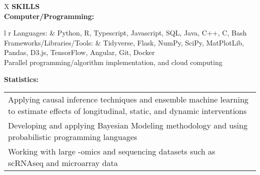 \begin{center}
    \begin{tabularx}{\textwidth}{X}
        {\large \textbf{SKILLS}} \\
        \small \textbf{Computer/Programming:} \\
        {
            \begin{tabularx}{\linewidth}{l r}
                \small \tabitem Languages: & \small Python, R, Typescript, Javascript, SQL, Java, C++, C, Bash \\
                \small \tabitem Frameworks/Libraries/Tools: & \small Tidyverse, Flask, NumPy, SciPy, MatPlotLib, Pandas, D3.js, TensorFlow, Angular, Git, Docker \\
                 {
                    \small \tabitem Parallel programming/algorithm implementation, and cloud computing
                } \\
            \end{tabularx}
        }
        \small \textbf{Statistics:} \\
        {
            \begin{tabularx}{\linewidth}{X}
                \small \tabitem Applying causal inference techniques and ensemble machine learning to estimate effects of longitudinal, static, and dynamic interventions \\
                \small \tabitem Developing and applying Bayesian Modeling methodology and using probabilistic programming languages \\
                \small \tabitem Working with large -omics and sequencing datasets such as scRNAseq and microarray data \\
            \end{tabularx}
        }
    \end{tabularx}
\end{center}


